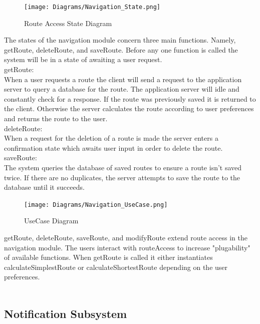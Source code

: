 \documentclass{article}
\begin{document}
				\begin{figure}[H]
                     \texttt{[image: Diagrams/Navigation\_State.png]}
                     \caption{Route Access State Diagram}
					 \label{fig:navigation_state}
			    \end{figure}
			    {The states of the navigation module concern three main functions. Namely, getRoute, deleteRoute, and saveRoute. Before any one function is called the system will be in a state of awaiting a user request.\\
			    
			    getRoute:\\
			    When a user requests a route the client will send a request to the application server to query a database for the route. The application server will idle and constantly check for a response. If the route was previously saved it is returned to the client. Otherwise the server calculates the route according to user preferences and returns the route to the user.\\
			    
			    deleteRoute:\\
			    When a request for the deletion of a route is made the server enters a confirmation state which awaits user input in order to delete the route.\\
			    
			    saveRoute:\\
			    The system queries the database of saved routes to ensure a route isn't saved twice. If there are no duplicates, the server attempts to save the route to the database until it succeeds.\\
			    }
			    
			    \begin{figure}[H]
                     \texttt{[image: Diagrams/Navigation\_UseCase.png]}
                     \caption{UseCase Diagram}
					 \label{fig:navigation_UseCase}
			    \end{figure}
			    {getRoute, deleteRoute, saveRoute, and modifyRoute extend route access in the navigation module. The users interact with routeAccess to increase "plugability" of available functions. When getRoute is called it either instantiates calculateSimplestRoute or calculateShortestRoute depending on the user preferences.\\\\}
				
				
			
			
			\subsection{Notification Subsystem}\label{subsec:notification}
			
\end{document}

